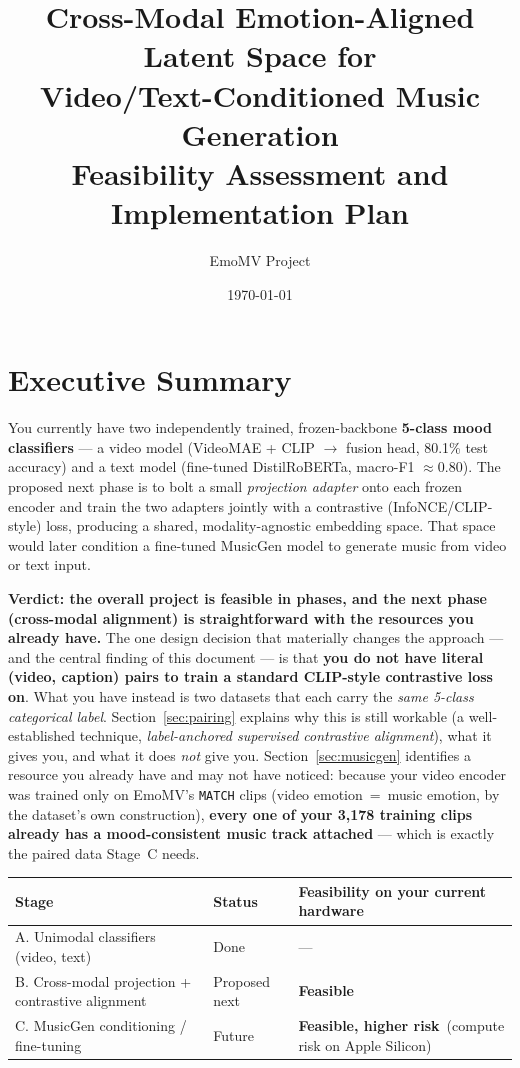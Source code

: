 \documentclass[11pt]{article}
\title{\textbf{Cross-Modal Emotion-Aligned Latent Space for\\ Video/Text-Conditioned Music Generation}\\
\large Feasibility Assessment and Implementation Plan}
\author{EmoMV Project}
\date{\today}
\newcommand{\good}{\textcolor{green!50!black}{\textbf{Feasible}}}
\newcommand{\risky}{\textcolor{orange!80!black}{\textbf{Feasible, higher risk}}}
\begin{document}
\maketitle
\tableofcontents

\section*{Executive Summary}

You currently have two independently trained, frozen-backbone \textbf{5-class mood classifiers} —
a video model (VideoMAE + CLIP $\to$ fusion head, 80.1\% test accuracy) and a text model
(fine-tuned DistilRoBERTa, macro-F1 $\approx 0.80$). The proposed next phase is to bolt a small
\emph{projection adapter} onto each frozen encoder and train the two adapters jointly with a
contrastive (InfoNCE/CLIP-style) loss, producing a shared, modality-agnostic embedding space.
That space would later condition a fine-tuned MusicGen model to generate music from video or text
input.

\textbf{Verdict: the overall project is feasible in phases, and the next phase (cross-modal
alignment) is straightforward with the resources you already have.} The one design decision that
materially changes the approach — and the central finding of this document — is that
\textbf{you do not have literal (video, caption) pairs to train a standard CLIP-style
contrastive loss on}. What you have instead is two datasets that each carry the \emph{same
5-class categorical label}. Section~\ref{sec:pairing} explains why this is still workable (a
well-established technique, \emph{label-anchored supervised contrastive alignment}), what it
gives you, and what it does \emph{not} give you. Section~\ref{sec:musicgen} identifies a
resource you already have and may not have noticed: because your video encoder was trained only
on EmoMV's \texttt{MATCH} clips (video emotion~=~music emotion, by the dataset's own
construction), \textbf{every one of your 3{,}178 training clips already has a mood-consistent
music track attached} — which is exactly the paired data Stage~C needs.

\begin{center}
\begin{tabularx}{\textwidth}{@{}X l X@{}}
\toprule
\textbf{Stage} & \textbf{Status} & \textbf{Feasibility on your current hardware} \\
\midrule
A. Unimodal classifiers (video, text) & Done & --- \\
B. Cross-modal projection + contrastive alignment & Proposed next & \good \\
C. MusicGen conditioning / fine-tuning & Future & \risky\ (compute risk on Apple Silicon) \\
\bottomrule
\end{tabularx}
\end{center}
\end{document}
